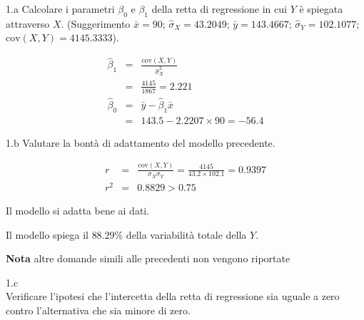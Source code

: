 \documentclass[
  11pt,
]{book}
\theoremstyle{mytheoremstyle}
\theoremstyle{mydefstyle}
\newenvironment{sol}
  {
  \begin{tcolorbox}[enhanced,breakable,arc=0.1mm,boxrule=1pt,colback=white,colframe=iblue,
  title=\bf \fontfamily{lmss}\selectfont \hspace{.5 cm} Soluzione,drop fuzzy shadow]

}{
\end{tcolorbox}
  }
\begin{document}
1.a Calcolare i parametri \(\beta_{0}\) e \(\beta_{1}\)
della retta di regressione in cui \(Y\) è spiegata attraverso \(X\).
(Suggerimento \(\bar{x} = 90\); \(\hat\sigma_{X} = 43.2049\);
\(\bar{y} = 143.4667\); \(\hat\sigma_{Y} = 102.1077\); \(\text{cov}(X,Y)= 4145.3333\)).

\begin{sol}
\begin{eqnarray*}
       \hat\beta_1 &=& \frac{\text{cov}(X,Y)}{\hat\sigma_X^2} \\
            &=& \frac{ 4145 }{ 1867 }  =  2.221 \\
      \hat\beta_0 &=& \bar y - \hat\beta_1 \bar x\\
          &=&  143.5 - 2.2207 \times  90 = -56.4 
      \end{eqnarray*}

\end{sol}

1.b Valutare la bontà di adattamento del modello precedente.

\begin{sol}
\begin{eqnarray*}
r&=&\frac{\text{cov}(X,Y)}{\sigma_X\sigma_Y}=\frac{ 4145 }{ 43.2 \times 102.1 }= 0.9397 \\ 
r^2&=& 0.8829 > 0.75
\end{eqnarray*}

Il modello si adatta bene ai dati.

Il modello spiega il \(88.29\%\) della variabilità totale della \(Y\).

\end{sol}

\textbf{Nota} altre domande simili alle precedenti non vengono riportate

1.c\\
Verificare l'ipotesi che l'intercetta della retta di
regressione sia uguale a zero contro l'alternativa che sia
minore di zero.
\end{document}
